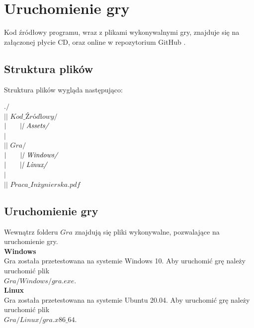 \chapter{Uruchomienie gry}
\thispagestyle{chapterBeginStyle}

Kod źródłowy programu, wraz z plikami wykonywalnymi gry, znajduje się na załączonej płycie CD, oraz online w repozytorium GitHub \cite{Github}.

\section{Struktura plików}
Struktura plików wygląda następująco:\\
\begin{algorithm}[H]
    $./$\\
    $|\textit{| Kod\_Źródłowy/}$\\
    $|\hskip2em |\textit{| Assets/}$\\
    $|$\\
    $|\textit{| Gra/}$\\
    $|\hskip2em |\textit{| Windows/}$\\
    $|\hskip2em |\textit{| Linux/}$\\
    $|$\\
    $|\textit{| Praca\_Inżynierska.pdf}$\\
\end{algorithm}

\section{Uruchomienie gry}
    Wewnątrz folderu $Gra$ znajdują się pliki wykonywalne, pozwalające na uruchomienie gry.\\
    \textbf{Windows}\\
    Gra została przetestowana na systemie Windows 10. Aby uruchomić grę należy uruchomić plik\\
    $Gra/Windows/gra.exe$.\\
    \textbf{Linux}\\
    Gra została przetestowana na systemie Ubuntu 20.04. Aby uruchomić grę należy uruchomić plik\\
    $Gra/Linux/gra.x86\_64$.\\

